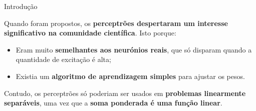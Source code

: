 \begin{frame}{Introdução \cont}
	    
	Quando foram propostos, os \textbf{perceptrões despertaram um interesse significativo na comunidade científica}. Isto porque:
	\begin{itemize}
		\item Eram muito \textbf{semelhantes aos neurónios reais}, que só disparam quando a quantidade de excitação é alta;
		\medskip
		\item Existia um \textbf{algoritmo de aprendizagem simples} para ajustar os pesos. 
	\end{itemize}
	    
	\pauseskip 
	
	Contudo, os perceptrões só poderiam ser usados em \textbf{problemas linearmente separáveis}, uma vez que a \textbf{soma ponderada é uma função linear}. 
	    
	
\end{frame}

